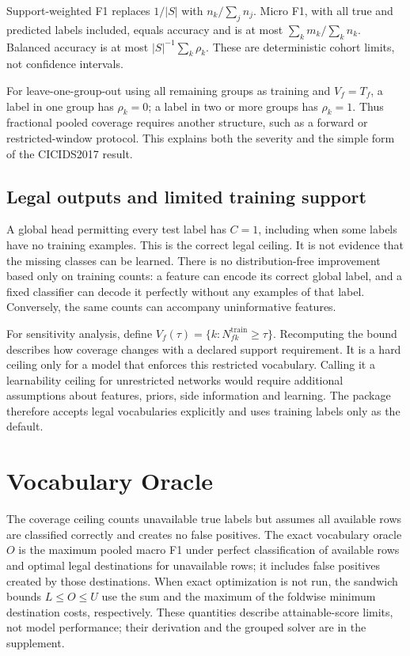 \documentclass[namedate,webpdf,contemporary,large]{TBench-template}
\begin{document}
Support-weighted F1 replaces \(1/|S|\) with \(n_k/\sum_jn_j\). Micro F1, with all true and predicted labels included, equals accuracy and is at most \(\sum_km_k/\sum_kn_k\). Balanced accuracy is at most \(|S|^{-1}\sum_k\rho_k\). These are deterministic cohort limits, not confidence intervals.

For leave-one-group-out using all remaining groups as training and \(V_f=T_f\), a label in one group has \(\rho_k=0\); a label in two or more groups has \(\rho_k=1\). Thus fractional pooled coverage requires another structure, such as a forward or restricted-window protocol. This explains both the severity and the simple form of the CICIDS2017 result.

\subsection{Legal outputs and limited training support}
A global head permitting every test label has \(C=1\), including when some labels have no training examples. This is the correct legal ceiling. It is not evidence that the missing classes can be learned. There is no distribution-free improvement based only on training counts: a feature can encode its correct global label, and a fixed classifier can decode it perfectly without any examples of that label. Conversely, the same counts can accompany uninformative features.

For sensitivity analysis, define \(V_f(\tau)=\{k:N^{\mathrm{train}}_{fk}\ge\tau\}\). Recomputing the bound describes how coverage changes with a declared support requirement. It is a hard ceiling only for a model that enforces this restricted vocabulary. Calling it a learnability ceiling for unrestricted networks would require additional assumptions about features, priors, side information and learning. The package therefore accepts legal vocabularies explicitly and uses training labels only as the default.

\section{Vocabulary Oracle}
The coverage ceiling counts unavailable true labels but assumes all available rows are classified correctly and creates no false positives. The exact vocabulary oracle \(O\) is the maximum pooled macro F1 under perfect classification of available rows and optimal legal destinations for unavailable rows; it includes false positives created by those destinations. When exact optimization is not run, the sandwich bounds \(L\le O\le U\) use the sum and the maximum of the foldwise minimum destination costs, respectively. These quantities describe attainable-score limits, not model performance; their derivation and the grouped solver are in the supplement.
\end{document}

